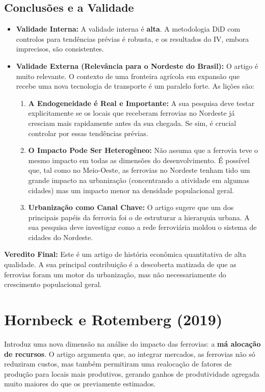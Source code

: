 \documentclass[12pt, a4paper]{article}
\begin{document}
\subsection{Conclusões e a Validade}
\begin{itemize}
    \item \textbf{Validade Interna:} A validade interna é \textbf{alta}. A metodologia DiD com controlos para tendências prévias é robusta, e os resultados do IV, embora imprecisos, são consistentes.
    \item \textbf{Validade Externa (Relevância para o Nordeste do Brasil):} O artigo é muito relevante. O contexto de uma fronteira agrícola em expansão que recebe uma nova tecnologia de transporte é um paralelo forte. As lições são:
        \begin{enumerate}
            \item \textbf{A Endogeneidade é Real e Importante:} A sua pesquisa deve testar explicitamente se os locais que receberam ferrovias no Nordeste já cresciam mais rapidamente antes da sua chegada. Se sim, é crucial controlar por essas tendências prévias.
            \item \textbf{O Impacto Pode Ser Heterogêneo:} Não assuma que a ferrovia teve o mesmo impacto em todas as dimensões do desenvolvimento. É possível que, tal como no Meio-Oeste, as ferrovias no Nordeste tenham tido um grande impacto na urbanização (concentrando a atividade em algumas cidades) mas um impacto menor na densidade populacional geral.
            \item \textbf{Urbanização como Canal Chave:} O artigo sugere que um dos principais papéis da ferrovia foi o de estruturar a hierarquia urbana. A sua pesquisa deve investigar como a rede ferroviária moldou o sistema de cidades do Nordeste.
        \end{enumerate}
\end{itemize}

\noindent\textbf{Veredito Final:} Este é um artigo de história econômica quantitativa de alta qualidade. A sua principal contribuição é a descoberta matizada de que as ferrovias foram um motor da urbanização, mas não necessariamente do crescimento populacional geral. 

\section{Hornbeck e Rotemberg (2019)}
Introduz uma nova dimensão na análise do impacto das ferrovias: a \textbf{má alocação de recursos}. O artigo argumenta que, ao integrar mercados, as ferrovias não só reduziram custos, mas também permitiram uma realocação de fatores de produção para locais mais produtivos, gerando ganhos de produtividade agregada muito maiores do que os previamente estimados.
\end{document}
